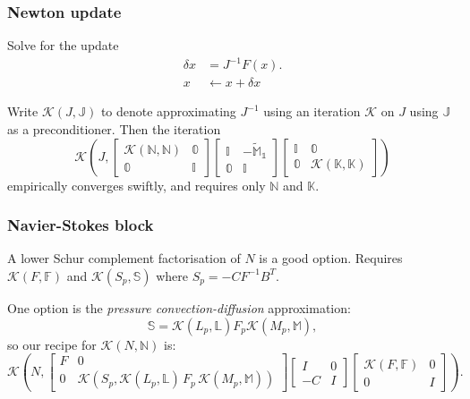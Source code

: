 \documentclass[presentation]{beamer}
\newcommand{\KSP}[2]{\ensuremath{\mathcal{K}\left(#1, \mathbb{#2}\right)}}
\newcommand{\ksp}[1]{\KSP{#1}{#1}}
\begin{document}
\begin{frame}
  \frametitle{Newton update}
  Solve for the update
  \begin{equation*}
    \begin{split}
      \delta x &= J^{-1} F(x). \\
      x &\leftarrow x + \delta x
    \end{split}
  \end{equation*}

  Write $\mathcal{K}(J, \mathbb{J})$ to denote approximating $J^{-1}$
  using an iteration $\mathcal{K}$ on $J$ using $\mathbb{J}$ as a
  preconditioner.  Then the iteration
  \begin{equation*}
    \KSP{J}{\begin{bmatrix}
      \ksp{N} & 0 \\
      0 & I
    \end{bmatrix}
    \begin{bmatrix}
      I & -\tilde{M}_1 \\
      0 & I
    \end{bmatrix}
    \begin{bmatrix}
      I & 0\\
      0 & \ksp{K}
    \end{bmatrix}}
  \end{equation*}
  empirically converges swiftly, and
  requires only $\mathbb{N}$ and $\mathbb{K}$.
\end{frame}

\begin{frame}
  \frametitle{Navier-Stokes block \parencite{Elman:2014}}
  A lower Schur complement factorisation of $N$ is a good option.
  Requires $\ksp{F}$ and $\KSP{S_p}{S}$ where $S_p = -C F^{-1} B^T$.

  One option is the \emph{pressure convection-diffusion}
  approximation:
  \begin{equation*}
    \mathbb{S} = \KSP{L_p}{L} F_p \KSP{M_p}{M},
  \end{equation*}
  so our recipe for $\ksp{N}$ is:
  \begin{equation*}
    \mathcal{K}\left(N, \begin{bmatrix}
      F & 0 \\
      0 & \mathcal{K}(S_p, \KSP{L_p}{L}\,F_p \, \KSP{M_p}{M})
    \end{bmatrix}
    \begin{bmatrix}
      I & 0\\
      -C & I
    \end{bmatrix}
    \begin{bmatrix}
      \ksp{F} & 0 \\
      0 & I
    \end{bmatrix}\right).
  \end{equation*}

\end{frame}
\end{document}
